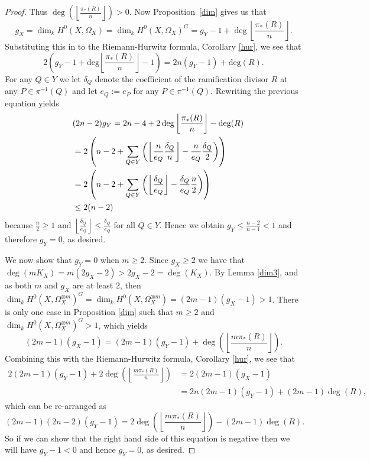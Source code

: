 \begin{proof}
Thus $\deg\left( \left\lfloor \frac{\pi_*(R)}{n} \right\rfloor \right) >0$. 
Now Proposition~\ref{dim} gives us that
\begin{equation*}
g_X=\dim_k H^0(X,\Omega_X)=\dim_k H^0(X,\Omega_X)^G= g_Y-1+\deg\left\lfloor \frac{\pi_*(R)}{n} \right\rfloor.
\end{equation*}
Substituting this in to the Riemann-Hurwitz formula, Corollary \ref{hur}, we see that
\begin{equation*}
2\left(g_Y - 1 + \textrm{deg}\left \lfloor \frac{\pi_*(R)}{n} \right \rfloor -1 \right) = 2n (g_Y -1) + \textrm{deg}(R).
\end{equation*}
For any $Q \in Y$ we let $\delta_Q$ denote the coefficient of the ramification divisor $R$ at any $P \in \pi^{-1}(Q)$ and let $e_Q := e_P$ for any $P \in \pi^{-1}(Q)$. 
Rewriting the previous equation yields
\begin{align*}
\lefteqn{(2n-2)g_Y = 2n-4 + 2 \,\textrm{deg}\left \lfloor \frac{\pi_*(R)}{n}\right \rfloor - \textrm{deg}(R)}\\
&= 2 \left(n-2 + \sum_{Q \in Y} \left(\left\lfloor \frac{n}{e_Q} \frac{\delta_Q}{n} \right\rfloor - \frac{n}{e_Q} \frac{\delta_Q}{2}\right) \right)\\
&= 2 \left(n-2 + \sum_{Q \in Y} \left( \left\lfloor \frac{\delta_Q}{e_Q} \right\rfloor - \frac{\delta_Q}{e_Q} \frac{n}{2} \right)\right)\\
& \le  2(n-2)
\end{align*}
because $\frac{n}{2} \ge 1$ and $\left\lfloor \frac{\delta_Q}{e_Q}\right\rfloor \le \frac{\delta_Q}{e_Q}$ for all $Q \in Y$. 
Hence we obtain $g_Y \le \frac{n-2}{n-1} < 1$ and therefore $g_Y =0$, as desired.

We now show that $g_Y=0$ when $m\geq 2$. 
Since $g_X\geq 2$ we have that $\deg(mK_X)=m(2g_X-2)>2g_X-2=\deg(K_X)$.
By Lemma \ref{dim3}, and as both $m$ and $g_X$ are at least 2, then $\dim_kH^0(X,\Omega_X^{\otimes m})^G=\dim_kH^0(X,\Omega_X^{\otimes m})=(2m-1)(g_X-1)>1$.
There is only one case in Proposition \ref{dim} such that $m\geq 2$ and $\dim_k H^0(X,\Omega_X^{\otimes m})^G>1$, which yields 
\begin{equation*}
(2m-1)(g_X-1)=(2m-1)(g_Y-1)+\deg\left(\left\lfloor \frac{m\pi_*(R)}{n} \right\rfloor \right).
\end{equation*}
Combining this with the Riemann-Hurwitz formula, Corollary \ref{hur}, we see that
\begin{align*}
2(2m-1)(g_Y-1)+2\deg\left(\left\lfloor\frac{m\pi_*(R)}{n}\right\rfloor\right) & =  2(2m-1)(g_X-1)\\
& =  2n(2m-1)(g_Y-1)+(2m-1)\deg(R),
\end{align*}
which can be re-arranged as
\begin{equation*}
(2m-1)(2n-2)(g_Y-1)=2\deg\left(\left\lfloor\frac{m\pi_*(R)}{n}\right\rfloor\right)-(2m-1)\deg(R).
\end{equation*}
So if we can show that the right hand side of this equation is negative then we will have $g_Y-1<0$ and hence $g_Y=0$, as desired.


\end{proof}
